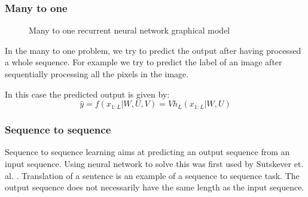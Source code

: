 \documentclass[11pt,oneside,openright]{report}
\begin{document}
\subsubsection{Many to one}
\begin{figure}[H]
\centering
{}
\caption{Many to one recurrent neural network graphical model }
\end{figure}

In the many to one problem, we try to predict the output after having processed a whole sequence. For example we try to predict the label of an image after sequentially processing all the pixels in the image.

In this case the predicted output is given by:
$$ \hat{y} = f(x_{1:L}|W, U, V) = V h_L(x_{1:L}|W,U)$$

\subsubsection{Sequence to sequence}

Sequence to sequence learning aims at predicting an output sequence from an input sequence. Using neural network to solve this was first used by Sutskever et. al. \cite{s2s}. Translation of a sentence is an example of a sequence to sequence task. The output sequence does not necessarily have the same length as the input sequence.
\end{document}
